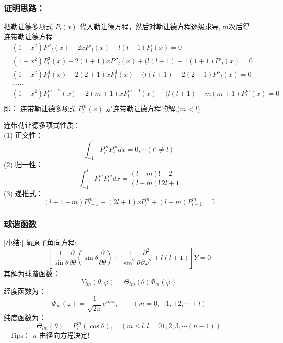\begin{frame}
	\frametitle{证明思路：}
	把勒让德多项式 $P_{l}(x) $ 代入勒让德方程，然后对勒让德方程逐级求导, m次后得连带勒让德方程
	\begin{equation*}
		\begin{split}
			&\left(1-x^{2}\right) P'' _l  (x) -2 x P' _l (x)+l(l+1)P_l(x)=0	\\
			&\left(1-x^{2}\right) P^{3} _l  (x) -2(1+1) x P'' _l (x)+(l(l+1)-1(1+1)P'_l(x)=0	\\
			&\left(1-x^{2}\right) P^{4} _l  (x) -2(2+1) x P^{3} _l (x)+(l(l+1)-2(2+1)P''_l(x)=0	\\
			& \cdots \cdots\\
			&\left(1-x^{2}\right) P^{m+2} _l  (x) -2(m+1) x P^{m+1} _l (x)+(l(l+1)-m(m+1)P^{m} _l(x)=0	\\
		\end{split}
	\end{equation*}
	即： 连带勒让德多项式  $P^{m} _l  (x)  $ 是连带勒让德方程的解,($m < l$)
\end{frame}	

\begin{frame}
	连带勒让德多项式性质：\\
	(1) 正交性： 
	\begin{equation*}
		\int_{-1}^{1} P^m _{l'}P^m _{l} dx =0 ,\cdots (l'\ne l)
	\end{equation*}	
	(2) 归一性：
	\begin{equation*}
		\int_{-1}^{1} P^m _l P^m _l dx =  \frac{(l+m)!}{(l-m)!}\frac{2}{2l+1}
	\end{equation*}	
	(3) 递推式： 
	\begin{equation*}
		(l+1-m)P^m _{l+1} -(2l+1)x P^m _l + (l+m) P^m _{l-1} =0 
	\end{equation*}		
\end{frame}	

\begin{frame}
	\frametitle{球谐函数}
	[小结:]
	氢原子角向方程:
	\begin{equation*}
		\left[ \frac{1}{ \sin \theta  } \frac{\partial }{\partial \theta } (\sin \theta \frac{\partial }{\partial \theta } )
		+\frac{1}{ \sin^2 \theta  } \frac{\partial^2}{\partial\varphi ^2} +l(l+1)\right] Y=0
	\end{equation*}	
	其解为球谐函数：
	\begin{equation*}
		Y_{lm}(\theta,\varphi)= \Theta_{lm}(\theta) \Phi_m (\varphi)
	\end{equation*}	
	经度函数为：
	\begin{equation*}
		\Phi_m (\varphi)=\frac{1}{\sqrt{2\pi}} e^{im\varphi}, \qquad (m=0,\pm 1, \pm 2, \cdots \pm l)
	\end{equation*}
	纬度函数为：
	\begin{equation*}
		\Theta_{lm}(\theta)= P^m  _{l}(\cos \theta) ,  \quad(m \le l, l=0 1,2,3, \cdots (n-1))
	\end{equation*}	 
	Tips： $n$ 由径向方程决定!
\end{frame}	

